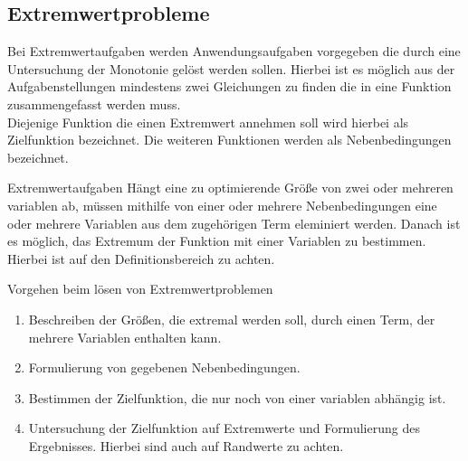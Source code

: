  \subsection{Extremwertprobleme}
 Bei Extremwertaufgaben werden Anwendungsaufgaben vorgegeben die durch eine Untersuchung der Monotonie gelöst werden sollen. Hierbei ist es möglich aus der Aufgabenstellungen mindestens zwei Gleichungen zu finden die in eine Funktion zusammengefasst werden muss.\\
 Diejenige Funktion die einen Extremwert annehmen soll wird hierbei als Zielfunktion bezeichnet. Die weiteren Funktionen werden als Nebenbedingungen bezeichnet.
 \begin{satz}{Extremwertaufgaben}{}
Hängt eine zu optimierende Größe von zwei oder mehreren variablen ab, müssen mithilfe von einer oder mehrere Nebenbedingungen eine oder mehrere Variablen aus dem zugehörigen Term eleminiert werden. Danach ist es möglich, das Extremum der Funktion mit einer Variablen zu bestimmen. Hierbei ist auf den Definitionsbereich zu achten.
 \end{satz}
 \begin{b8d}{Vorgehen beim lösen von Extremwertproblemen}{}
\begin{enumerate}
    \item Beschreiben der Größen, die extremal werden soll, durch einen Term, der mehrere Variablen enthalten kann.
    \item Formulierung von gegebenen Nebenbedingungen.
    \item Bestimmen der Zielfunktion, die nur noch von einer variablen abhängig ist.
    \item Untersuchung der Zielfunktion auf Extremwerte und Formulierung des Ergebnisses. Hierbei sind auch auf Randwerte zu achten.
\end{enumerate}
 \end{b8d}
